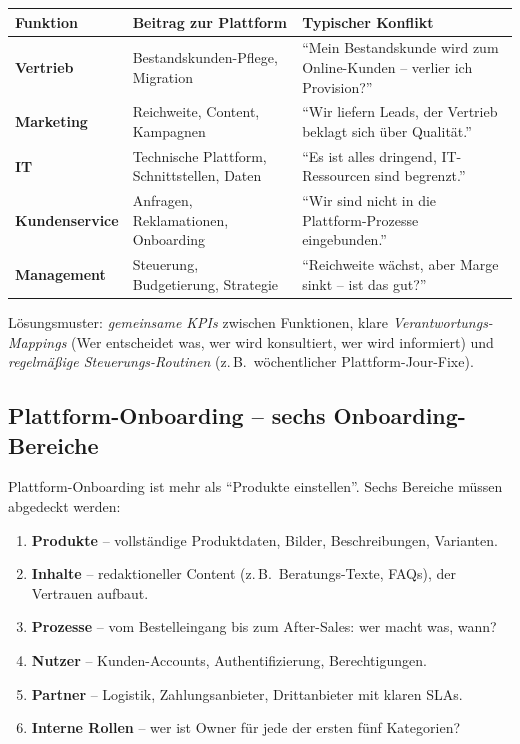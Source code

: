 \documentclass[11pt,a4paper,oneside]{article}
\begin{document}
\begin{tabularx}{\linewidth}{@{}>{\bfseries}lX X@{}}
\toprule
Funktion & Beitrag zur Plattform & Typischer Konflikt \\
\midrule
Vertrieb & Bestandskunden-Pflege, Migration & ``Mein Bestandskunde wird zum Online-Kunden -- verlier ich Provision?'' \\
Marketing & Reichweite, Content, Kampagnen & ``Wir liefern Leads, der Vertrieb beklagt sich über Qualität.'' \\
IT & Technische Plattform, Schnittstellen, Daten & ``Es ist alles dringend, IT-Ressourcen sind begrenzt.'' \\
Kundenservice & Anfragen, Reklamationen, Onboarding & ``Wir sind nicht in die Plattform-Prozesse eingebunden.'' \\
Management & Steuerung, Budgetierung, Strategie & ``Reichweite wächst, aber Marge sinkt -- ist das gut?'' \\
\bottomrule
\end{tabularx}

\medskip

\noindent Lösungsmuster: \emph{gemeinsame KPIs} zwischen Funktionen, klare \emph{Verantwortungs-Mappings} (Wer entscheidet was, wer wird konsultiert, wer wird informiert) und \emph{regelmäßige Steuerungs-Routinen} (z.\,B.\ wöchentlicher Plattform-Jour-Fixe).

\subsection{Plattform-Onboarding -- sechs Onboarding-Bereiche}

Plattform-Onboarding ist mehr als ``Produkte einstellen''. Sechs Bereiche müssen abgedeckt werden:

\begin{enumerate}
  \item \textbf{Produkte} -- vollständige Produktdaten, Bilder, Beschreibungen, Varianten.
  \item \textbf{Inhalte} -- redaktioneller Content (z.\,B.\ Beratungs-Texte, FAQs), der Vertrauen aufbaut.
  \item \textbf{Prozesse} -- vom Bestelleingang bis zum After-Sales: wer macht was, wann?
  \item \textbf{Nutzer} -- Kunden-Accounts, Authentifizierung, Berechtigungen.
  \item \textbf{Partner} -- Logistik, Zahlungsanbieter, Drittanbieter mit klaren SLAs.
  \item \textbf{Interne Rollen} -- wer ist Owner für jede der ersten fünf Kategorien?
\end{enumerate}
\end{document}
